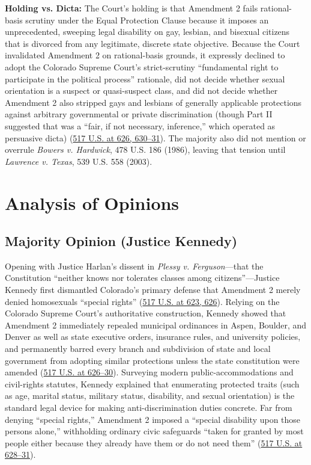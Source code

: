 \documentclass[12pt]{article}
\begin{document}
\textbf{Holding vs. Dicta:} The Court's holding is that Amendment 2 fails rational-basis scrutiny under the Equal Protection Clause because it imposes an unprecedented, sweeping legal disability on gay, lesbian, and bisexual citizens that is divorced from any legitimate, discrete state objective. Because the Court invalidated Amendment 2 on rational-basis grounds, it expressly declined to adopt the Colorado Supreme Court's strict-scrutiny ``fundamental right to participate in the political process'' rationale, did not decide whether sexual orientation is a suspect or quasi-suspect class, and did not decide whether Amendment 2 also stripped gays and lesbians of generally applicable protections against arbitrary governmental or private discrimination (though Part II suggested that was a ``fair, if not necessary, inference,'' which operated as persuasive dicta) (\href{https://supreme.justia.com/cases/federal/us/517/620/}{517 U.S. at 626, 630--31}). The majority also did not mention or overrule \textit{Bowers v. Hardwick}, 478 U.S. 186 (1986), leaving that tension until \textit{Lawrence v. Texas}, 539 U.S. 558 (2003).

\section{Analysis of Opinions}

\subsection{Majority Opinion (Justice Kennedy)}

Opening with Justice Harlan's dissent in \textit{Plessy v. Ferguson}---that the Constitution ``neither knows nor tolerates classes among citizens''---Justice Kennedy first dismantled Colorado's primary defense that Amendment 2 merely denied homosexuals ``special rights'' (\href{https://supreme.justia.com/cases/federal/us/517/620/}{517 U.S. at 623, 626}). Relying on the Colorado Supreme Court's authoritative construction, Kennedy showed that Amendment 2 immediately repealed municipal ordinances in Aspen, Boulder, and Denver as well as state executive orders, insurance rules, and university policies, and permanently barred every branch and subdivision of state and local government from adopting similar protections unless the state constitution were amended (\href{https://supreme.justia.com/cases/federal/us/517/620/}{517 U.S. at 626--30}). Surveying modern public-accommodations and civil-rights statutes, Kennedy explained that enumerating protected traits (such as age, marital status, military status, disability, and sexual orientation) is the standard legal device for making anti-discrimination duties concrete. Far from denying ``special rights,'' Amendment 2 imposed a ``special disability upon those persons alone,'' withholding ordinary civic safeguards ``taken for granted by most people either because they already have them or do not need them'' (\href{https://supreme.justia.com/cases/federal/us/517/620/}{517 U.S. at 628--31}).
\end{document}

